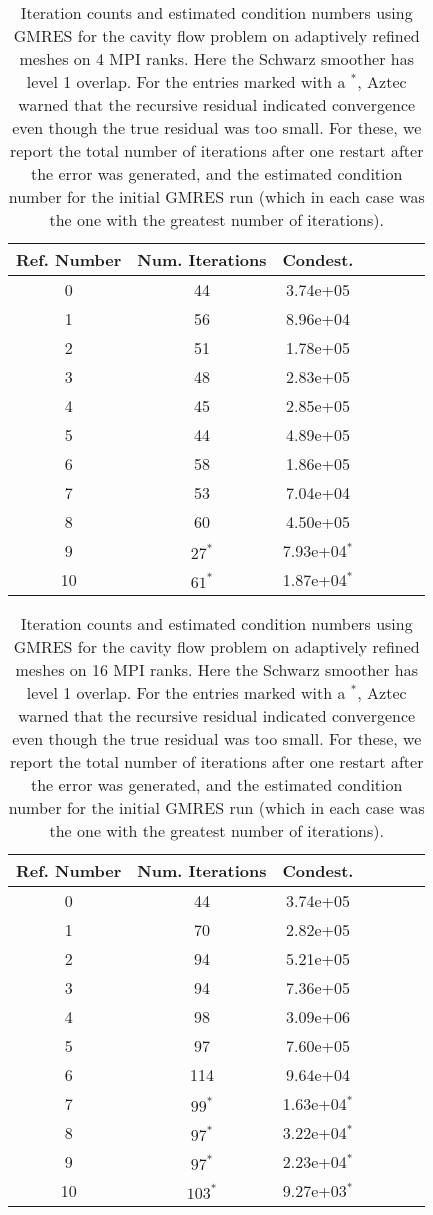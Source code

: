 \documentclass[11pt]{amsart}
\begin{document}
\begin{table}
\begin{tabular}{ c  c  c  c  c  c c}
Ref. Number	&Num. Iterations	&Condest.\\
\hline
0	&44	&3.74e+05\\
1	&56	&8.96e+04\\
2	&51	&1.78e+05\\
3	&48	&2.83e+05\\
4	&45	&2.85e+05\\
5	&44	&4.89e+05\\
6	&58	&1.86e+05\\
7	&53	&7.04e+04\\
8	&60	&4.50e+05\\
9	&$27^*$	&7.93e+04$^*$\\
10 	&$61^*$	&1.87e+04$^*$\\
\end{tabular}
\caption{Iteration counts and estimated condition numbers using GMRES for the cavity flow problem on adaptively refined meshes on 4 MPI ranks.  Here the Schwarz smoother has level 1 overlap.  For the entries marked with a $^*$, Aztec warned that the recursive residual indicated convergence even though the true residual was too small.  For these, we report the total number of iterations after one restart after the error was generated, and the estimated condition number for the initial GMRES run (which in each case was the one with the greatest number of iterations).}
\label{table:stokesConditioningStudyAdaptiveMeshes4RanksGMRES}
\end{table}

\begin{table}
\begin{tabular}{ c  c  c  c  c  c c}
Ref. Number	&Num. Iterations	&Condest.\\
\hline
0	&44	&3.74e+05\\
1	&70	&2.82e+05\\
2	&94	&5.21e+05\\
3	&94	&7.36e+05\\
4	&98	&3.09e+06\\
5	&97	&7.60e+05\\
6	&114	&9.64e+04\\
7	&$99^*$	&1.63e+04$^*$\\
8	&$97^*$	&3.22e+04$^*$\\
9	&$97^*$	&2.23e+04$^*$\\
10 	&$103^*$	&9.27e+03$^*$\\
\end{tabular}
\caption{Iteration counts and estimated condition numbers using GMRES for the cavity flow problem on adaptively refined meshes on 16 MPI ranks.  Here the Schwarz smoother has level 1 overlap.  For the entries marked with a $^*$, Aztec warned that the recursive residual indicated convergence even though the true residual was too small.  For these, we report the total number of iterations after one restart after the error was generated, and the estimated condition number for the initial GMRES run (which in each case was the one with the greatest number of iterations).}
\label{table:stokesConditioningStudyAdaptiveMeshes16RanksGMRES}
\end{table}
\end{document}

